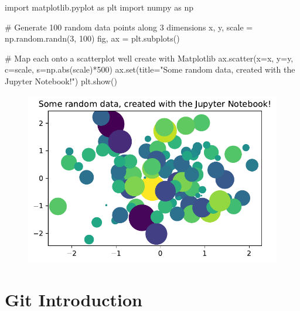 \documentclass[
  letterpaper,
  DIV=11,
  numbers=noendperiod]{scrreprt}
\newenvironment{Shaded}{\begin{snugshade}}{\end{snugshade}}
\newcommand{\BuiltInTok}[1]{\textcolor[rgb]{0.00,0.23,0.31}{#1}}
\newcommand{\CommentTok}[1]{\textcolor[rgb]{0.37,0.37,0.37}{#1}}
\newcommand{\DecValTok}[1]{\textcolor[rgb]{0.68,0.00,0.00}{#1}}
\newcommand{\ImportTok}[1]{\textcolor[rgb]{0.00,0.46,0.62}{#1}}
\newcommand{\NormalTok}[1]{\textcolor[rgb]{0.00,0.23,0.31}{#1}}
\newcommand{\OperatorTok}[1]{\textcolor[rgb]{0.37,0.37,0.37}{#1}}
\newcommand{\StringTok}[1]{\textcolor[rgb]{0.13,0.47,0.30}{#1}}
\begin{document}
\begin{Shaded}
\begin{Highlighting}[]
\ImportTok{import}\NormalTok{ matplotlib.pyplot }\ImportTok{as}\NormalTok{ plt}
\ImportTok{import}\NormalTok{ numpy }\ImportTok{as}\NormalTok{ np}

\CommentTok{\# Generate 100 random data points along 3 dimensions}
\NormalTok{x, y, scale }\OperatorTok{=}\NormalTok{ np.random.randn(}\DecValTok{3}\NormalTok{, }\DecValTok{100}\NormalTok{)}
\NormalTok{fig, ax }\OperatorTok{=}\NormalTok{ plt.subplots()}

\CommentTok{\# Map each onto a scatterplot we\textquotesingle{}ll create with Matplotlib}
\NormalTok{ax.scatter(x}\OperatorTok{=}\NormalTok{x, y}\OperatorTok{=}\NormalTok{y, c}\OperatorTok{=}\NormalTok{scale, s}\OperatorTok{=}\NormalTok{np.}\BuiltInTok{abs}\NormalTok{(scale)}\OperatorTok{*}\DecValTok{500}\NormalTok{)}
\NormalTok{ax.}\BuiltInTok{set}\NormalTok{(title}\OperatorTok{=}\StringTok{"Some random data, created with the Jupyter Notebook!"}\NormalTok{)}
\NormalTok{plt.show()}
\end{Highlighting}
\end{Shaded}

\begin{figure}[H]

{\centering \includegraphics{a_01_intro_to_notebooks_files/figure-pdf/cell-3-output-1.pdf}

}

\end{figure}

\hypertarget{git-introduction}{%
\chapter{Git Introduction}\label{git-introduction}}
\end{document}
